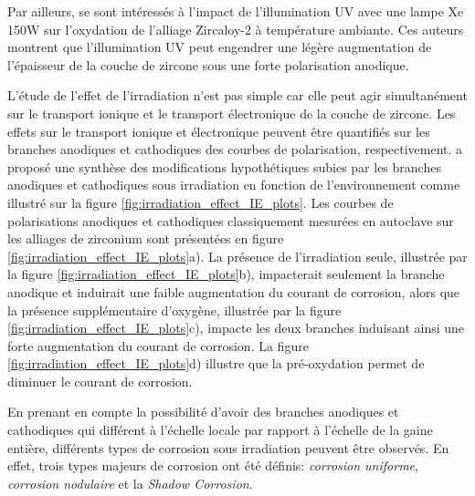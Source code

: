 \begin{refsection}
    
    Par ailleurs, \citet{Cox1989} se sont intéressés à l'impact de l'illumination UV avec une lampe Xe 150W sur l'oxydation
    de l'alliage Zircaloy-2 à température ambiante.
    Ces auteurs montrent que l'illumination UV peut engendrer une légère augmentation de
    l'épaisseur de la couche de zircone sous une forte polarisation anodique. 

    L'étude de l'effet de l'irradiation n'est pas simple car elle peut agir simultanément sur le transport ionique et
    le transport électronique de la couche de zircone. Les effets sur le transport ionique et électronique peuvent être
    quantifiés sur les branches anodiques et cathodiques des courbes de polarisation, respectivement. 
    \citet{Cox1968} a proposé une synthèse des modifications hypothétiques subies par les branches anodiques et
    cathodiques sous irradiation en fonction de l'environnement comme illustré sur la figure
    \ref{fig:irradiation_effect_IE_plots}. Les courbes de polarisations anodiques et cathodiques classiquement mesurées en
    autoclave sur les alliages de zirconium sont présentées en figure \ref{fig:irradiation_effect_IE_plots}a).
    La présence de l'irradiation seule, illustrée par la figure \ref{fig:irradiation_effect_IE_plots}b), 
    impacterait seulement la branche anodique et induirait une faible augmentation du courant de corrosion, 
    alors que la présence supplémentaire d'oxygène, illustrée par la figure \ref{fig:irradiation_effect_IE_plots}c), impacte 
    les deux branches induisant ainsi une forte augmentation du courant de corrosion. La figure
    \ref{fig:irradiation_effect_IE_plots}d) illustre que la pré-oxydation permet de diminuer le courant de corrosion.

    En prenant en compte la possibilité d'avoir des branches anodiques et
    cathodiques qui différent à l'échelle locale par rapport à l'échelle de la gaine entière, différents types de corrosion
    sous irradiation peuvent être observés. En effet, trois types majeurs de corrosion ont été
    définis: \emph{corrosion uniforme}, \emph{corrosion nodulaire} et la \emph{Shadow Corrosion}.


\end{refsection}
